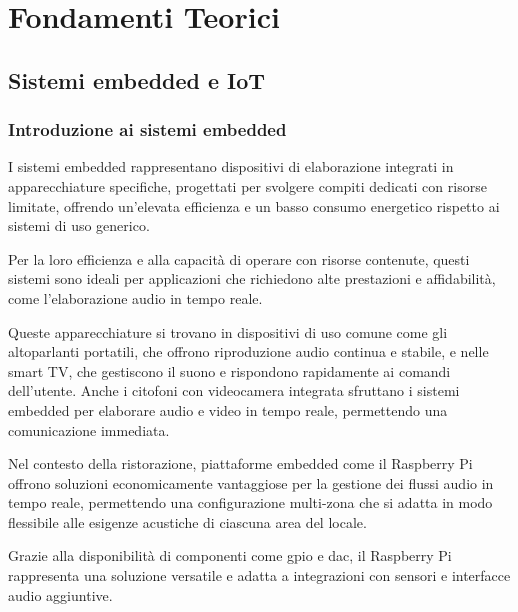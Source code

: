 
%

\chapter{Fondamenti Teorici}


\section{Sistemi embedded e IoT}

\subsection{Introduzione ai sistemi embedded}
\noindent

I sistemi embedded rappresentano dispositivi di elaborazione integrati in apparecchiature specifiche, progettati per svolgere compiti dedicati con risorse limitate, offrendo un’elevata efficienza e un basso consumo energetico rispetto ai sistemi di uso generico.

Per la loro efficienza e alla capacità di operare con risorse contenute, questi sistemi sono ideali per applicazioni che richiedono alte prestazioni e affidabilità, come l’elaborazione audio in tempo reale.

Queste apparecchiature si trovano in dispositivi di uso comune come gli altoparlanti portatili, che offrono riproduzione audio continua e stabile, e nelle smart TV, che gestiscono il suono e rispondono rapidamente ai comandi dell’utente. Anche i citofoni con videocamera integrata sfruttano i sistemi embedded per elaborare audio e video in tempo reale, permettendo una comunicazione immediata.

Nel contesto della ristorazione, piattaforme embedded come il Raspberry Pi offrono soluzioni economicamente vantaggiose per la gestione dei flussi audio in tempo reale, permettendo una configurazione multi-zona che si adatta in modo flessibile alle esigenze acustiche di ciascuna area del locale.

Grazie alla disponibilità di componenti come \gls{gpio} e \gls{dac}, il Raspberry Pi rappresenta una soluzione versatile e adatta a integrazioni con sensori e interfacce audio aggiuntive. \cite{magpi2020}

